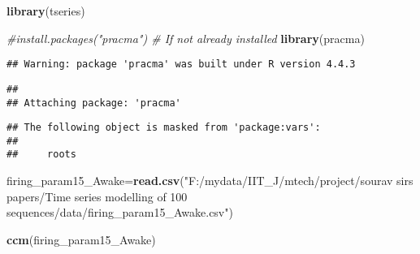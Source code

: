 \documentclass[
]{article}
\newenvironment{Shaded}{\begin{snugshade}}{\end{snugshade}}
\newcommand{\CommentTok}[1]{\textcolor[rgb]{0.56,0.35,0.01}{\textit{#1}}}
\newcommand{\FunctionTok}[1]{\textcolor[rgb]{0.13,0.29,0.53}{\textbf{#1}}}
\newcommand{\NormalTok}[1]{#1}
\newcommand{\OtherTok}[1]{\textcolor[rgb]{0.56,0.35,0.01}{#1}}
\newcommand{\StringTok}[1]{\textcolor[rgb]{0.31,0.60,0.02}{#1}}
\begin{document}
\begin{Shaded}
\begin{Highlighting}[]
\FunctionTok{library}\NormalTok{(tseries)}

\CommentTok{\#install.packages("pracma")  \# If not already installed}
\FunctionTok{library}\NormalTok{(pracma)}
\end{Highlighting}
\end{Shaded}

\begin{verbatim}
## Warning: package 'pracma' was built under R version 4.4.3
\end{verbatim}

\begin{verbatim}
## 
## Attaching package: 'pracma'
\end{verbatim}

\begin{verbatim}
## The following object is masked from 'package:vars':
## 
##     roots
\end{verbatim}

\begin{Shaded}
\begin{Highlighting}[]
\NormalTok{firing\_param15\_Awake}\OtherTok{=}\FunctionTok{read.csv}\NormalTok{(}\StringTok{"F:/mydata/IIT\_J/mtech/project/sourav sirs papers/Time series modelling of 100 sequences/data/firing\_param15\_Awake.csv"}\NormalTok{)}


\FunctionTok{ccm}\NormalTok{(firing\_param15\_Awake)}
\end{Highlighting}
\end{Shaded}
\end{document}
